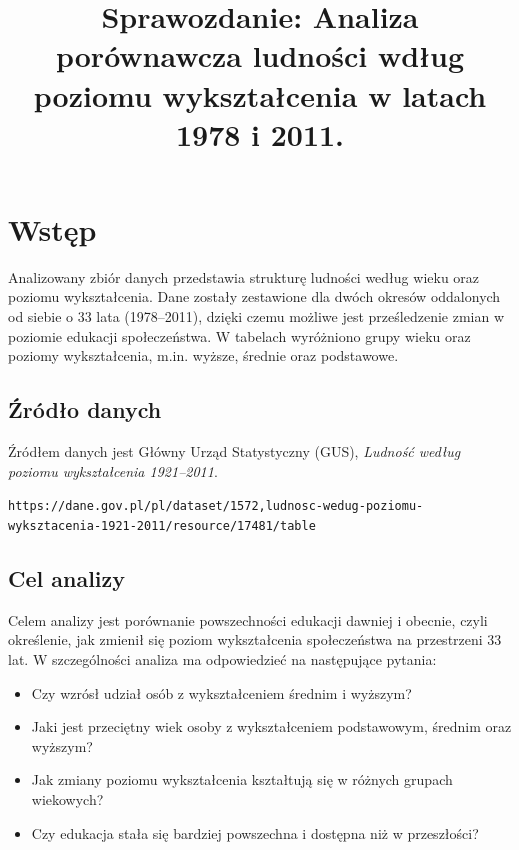 \documentclass[15pt]{article}
\begin{document}
{\centering
\title{Sprawozdanie: Analiza porównawcza ludności wdług poziomu wykształcenia w latach 1978 i 2011.}
\date{}
\maketitle}

\section{Wstęp}
Analizowany zbiór danych przedstawia strukturę ludności według wieku oraz poziomu wykształcenia. Dane zostały zestawione dla dwóch okresów oddalonych od siebie o 33 lata (1978--2011), dzięki czemu możliwe jest prześledzenie zmian w poziomie edukacji społeczeństwa. W tabelach wyróżniono grupy wieku oraz poziomy wykształcenia, m.in. wyższe, średnie oraz podstawowe.

\subsection{Źródło danych}

Źródłem danych jest Główny Urząd Statystyczny (GUS), \textit{Ludność według poziomu wykształcenia 1921--2011}.

\begin{flushleft}
	\texttt{https://dane.gov.pl/pl/dataset/1572,ludnosc-wedug-poziomu-wyksztacenia-1921-2011/resource/17481/table}
\end{flushleft}

\subsection{Cel analizy}

Celem analizy jest porównanie powszechności edukacji dawniej i obecnie, czyli określenie, jak zmienił się poziom wykształcenia społeczeństwa na przestrzeni 33 lat. W szczególności analiza ma odpowiedzieć na następujące pytania:

\begin{itemize}
	\item Czy wzrósł udział osób z wykształceniem średnim i wyższym?
	\item Jaki jest przeciętny wiek osoby z wykształceniem podstawowym, średnim oraz wyższym?
	\item Jak zmiany poziomu wykształcenia kształtują się w różnych grupach wiekowych?
	\item Czy edukacja stała się bardziej powszechna i dostępna niż w przeszłości?
\end{itemize}
\end{document}
